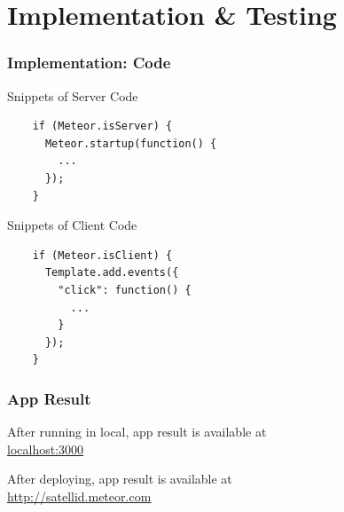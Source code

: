 \documentclass[10pt, compress]{beamer}
\begin{document}

\section{Implementation \& Testing}


\begin{frame}[fragile]
  \frametitle{Implementation: Code}

  Snippets of Server Code
  \begin{verbatim}
    if (Meteor.isServer) {
      Meteor.startup(function() {
        ...
      });
    }
  \end{verbatim}

  Snippets of Client Code
  \begin{verbatim}
    if (Meteor.isClient) {
      Template.add.events({
        "click": function() {
          ...
        }
      });
    }
  \end{verbatim}

\end{frame}


\begin{frame}[fragile]
  \frametitle{App Result}

  After running in local,
  app result is available at\\
  \url{localhost:3000}

  After deploying,
  app result is available at\\
  \url{http://satellid.meteor.com}

\end{frame}

\end{document}
